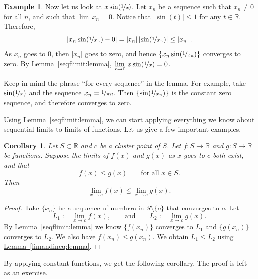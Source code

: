 \documentclass[12pt]{book}
\newcommand{\abs}[1]{\left\lvert {#1} \right\rvert}
\newcommand{\R}{{\mathbb{R}}}
\theoremstyle{plain}
\newtheorem{cor}[thm]{Corollary}
\theoremstyle{remark}
\theoremstyle{definition}
\theoremstyle{exercise}
\theoremstyle{example}
\newtheorem{example}[thm]{Example}
\newcommand{\lemmaref}[1]{\hyperref[#1]{Lemma~\ref*{#1}}}
\begin{document}
\begin{example}
Now let us look at $x\sin(\nicefrac{1}{x})$.  Let $x_n$ be a sequence
such that $x_n \not= 0$ for all $n$, and such that $\lim\, x_n = 0$.
Notice that $\abs{\sin(t)} \leq 1$ for any $t \in \R$.  Therefore,
\begin{equation*}
\abs{x_n\sin(\nicefrac{1}{x_n})-0}
=
\abs{x_n}\abs{\sin(\nicefrac{1}{x_n})}
\leq
\abs{x_n} .
\end{equation*}
As $x_n$ goes to 0, then $\abs{x_n}$ goes to zero, and hence
$\{ x_n\sin(\nicefrac{1}{x_n}) \}$ converges to zero.  By
\lemmaref{seqflimit:lemma}, 
$\displaystyle \lim_{x \to 0} \, x\sin( \nicefrac{1}{x} ) = 0$.
\end{example}

Keep in mind the phrase ``for every sequence'' in the lemma.
For example, take $\sin(\nicefrac{1}{x})$ and the sequence $x_n = \nicefrac{1}{\pi n}$.
Then $\{ \sin (\nicefrac{1}{x_n}) \}$ is the constant zero sequence, and
therefore converges to zero.

Using \lemmaref{seqflimit:lemma}, 
we can start applying everything we know about
sequential limits to limits of functions.  Let us give a few important
examples.

\begin{cor}
Let $S \subset \R$ and $c$ be a cluster point of $S$.  Let $f \colon S \to
\R$ and $g \colon S \to \R$ be functions.
Suppose the limits of $f(x)$ and $g(x)$ as $x$ goes to $c$ both exist,
and that
\begin{equation*}
f(x) \leq g(x) \qquad \text{for all $x \in S$}.
\end{equation*}
Then
\begin{equation*}
\lim_{x\to c} f(x) \leq \lim_{x\to c} g(x) .
\end{equation*}
\end{cor}

\begin{proof}
Take $\{ x_n \}$ be a sequence of numbers in $S \setminus \{ c \}$
that converges to $c$.  Let
\begin{equation*}
L_1 := \lim_{x\to c} f(x), \qquad \text{and} \qquad L_2 := \lim_{x\to c} g(x) .
\end{equation*}
By \lemmaref{seqflimit:lemma} we know $\{ f(x_n) \}$ converges to
$L_1$ and $\{ g(x_n) \}$ converges to $L_2$.  We also
have $f(x_n) \leq g(x_n)$.
We obtain $L_1 \leq L_2$ using
\lemmaref{limandineq:lemma}.
\end{proof}

By applying constant functions, we get the following corollary.  The
proof is left as an exercise.
\end{document}
